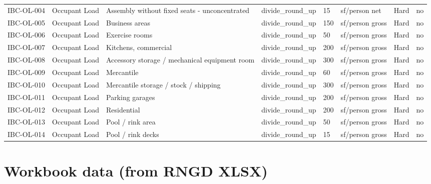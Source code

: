 \documentclass[10pt]{article}
\begin{document}
\begin{longtable}{p{1.6cm}p{2.6cm}p{5.2cm}p{1.1cm}p{1.6cm}p{1.3cm}p{1.3cm}p{1.5cm}}
IBC-OL-004 & Occupant Load & Assembly without fixed seats - unconcentrated & divide\_round\_up & 15 & sf/person net & Hard & no \\
IBC-OL-005 & Occupant Load & Business areas & divide\_round\_up & 150 & sf/person gross & Hard & no \\
IBC-OL-006 & Occupant Load & Exercise rooms & divide\_round\_up & 50 & sf/person gross & Hard & no \\
IBC-OL-007 & Occupant Load & Kitchens, commercial & divide\_round\_up & 200 & sf/person gross & Hard & no \\
IBC-OL-008 & Occupant Load & Accessory storage / mechanical equipment room & divide\_round\_up & 300 & sf/person gross & Hard & no \\
IBC-OL-009 & Occupant Load & Mercantile & divide\_round\_up & 60 & sf/person gross & Hard & no \\
IBC-OL-010 & Occupant Load & Mercantile storage / stock / shipping & divide\_round\_up & 300 & sf/person gross & Hard & no \\
IBC-OL-011 & Occupant Load & Parking garages & divide\_round\_up & 200 & sf/person gross & Hard & no \\
IBC-OL-012 & Occupant Load & Residential & divide\_round\_up & 200 & sf/person gross & Hard & no \\
IBC-OL-013 & Occupant Load & Pool / rink area & divide\_round\_up & 50 & sf/person gross & Hard & no \\
IBC-OL-014 & Occupant Load & Pool / rink decks & divide\_round\_up & 15 & sf/person gross & Hard & no \\
\bottomrule\end{longtable}

\section{Workbook data (from RNGD XLSX)}
\end{document}
